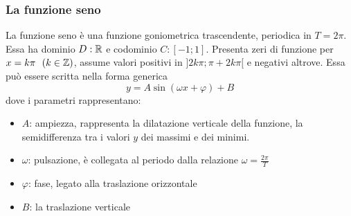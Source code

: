 \documentclass{article}     %
\begin{document}
    \subsubsection{La funzione seno}
        \begin{wrapfigure}{r}{0.5\textwidth}
            \centering
            \begin{center}
            \end{center}
        \end{wrapfigure}
        La funzione seno è una funzione goniometrica trascendente, periodica in $T=2\pi$. Essa ha dominio $D:\mathbb{R}$ e codominio $C:[-1;1]$. Presenta zeri di funzione per $x=k\pi~~(k\in\mathbb{Z})$, assume valori positivi in $]2k\pi;\pi+2k\pi[$ e negativi altrove. Essa può essere scritta nella forma generica \[y=A\sin(\omega x +\varphi)+B\] dove i parametri rappresentano:
        \begin{itemize}
            \item $A$: ampiezza, rappresenta la dilatazione verticale della funzione, la semidifferenza tra i valori $y$ dei massimi e dei minimi.
            \item $\omega$: pulsazione, è collegata al periodo dalla relazione $\omega =\frac{2\pi}{T}$
            \item $\varphi$: fase, legato alla traslazione orizzontale
            \item $B$: la traslazione verticale
        \end{itemize}
\end{document}

